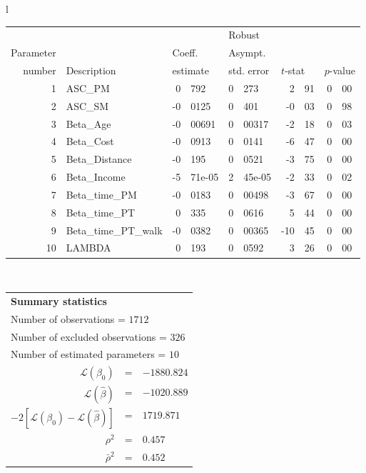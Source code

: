   \begin{tabular}{l}
\begin{tabular}{rlr@{.}lr@{.}lr@{.}lr@{.}l}
         &                       &   \multicolumn{2}{l}{}    & \multicolumn{2}{l}{Robust}  &     \multicolumn{4}{l}{}   \\
Parameter &                       &   \multicolumn{2}{l}{Coeff.}      & \multicolumn{2}{l}{Asympt.}  &     \multicolumn{4}{l}{}   \\
number &  Description                     &   \multicolumn{2}{l}{estimate}      & \multicolumn{2}{l}{std. error}  &   \multicolumn{2}{l}{$t$-stat}  &   \multicolumn{2}{l}{$p$-value}   \\

\hline

1 & ASC_PM  & 0&792 & 0&273 & 2&91 & 0&00\\
2 & ASC_SM & -0&0125 & 0&401 & -0&03 & 0&98\\
3 & Beta_Age & -0&00691 & 0&00317 & -2&18 & 0&03\\
4 & Beta_Cost & -0&0913 & 0&0141 & -6&47 & 0&00\\
5 & Beta_Distance & -0&195 & 0&0521 & -3&75 & 0&00\\
6 & Beta_Income & -5&71e-05 & 2&45e-05 & -2&33 & 0&02\\
7 & Beta_time_PM & -0&0183 & 0&00498 & -3&67 & 0&00\\
8 & Beta_time_PT & 0&335 & 0&0616 & 5&44 & 0&00\\
9 & Beta_time_PT_walk & -0&0382 & 0&00365 & -10&45 & 0&00\\
10 & LAMBDA & 0&193 & 0&0592 & 3&26 & 0&00\\
\hline
\end{tabular}
\\
\begin{tabular}{rcl}
\multicolumn{3}{l}{\bf Summary statistics}\\
\multicolumn{3}{l}{ Number of observations = $1712$} \\
\multicolumn{3}{l}{ Number of excluded observations = $326$} \\
\multicolumn{3}{l}{ Number of estimated  parameters = $10$} \\
 $\mathcal{L}(\beta_0)$ &=&  $-1880.824$ \\
 $\mathcal{L}(\hat{\beta})$ &=& $-1020.889 $  \\
 $-2[\mathcal{L}(\beta_0) -\mathcal{L}(\hat{\beta})]$ &=& $1719.871$ \\
    $\rho^2$ &=&   $0.457$ \\
    $\bar{\rho}^2$ &=&    $0.452$ \\
\end{tabular}
  \end{tabular}
